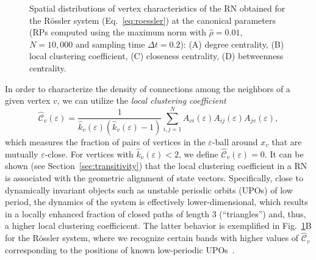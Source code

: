 \documentclass[graybox]{svmult}
\begin{document}
\begin{figure}
\centering
{}
\caption{Spatial distributions of vertex characteristics of the RN obtained for the R\"ossler system (Eq.~\ref{eq:roessler}) at the canonical parameters (RPs computed using the maximum norm with $\hat{\rho}=0.01$, $N=10,000$ and sampling time $\Delta t=0.2$): (A) degree centrality, (B) local clustering coefficient, (C) closeness centrality, (D) betweenness centrality.}
\label{fig:local}
\end{figure}

In order to characterize the density of connections among the neighbors of a given vertex $v$, we can utilize the \textit{local clustering coefficient}
\begin{equation}
\hat{\mathcal{C}}_v(\varepsilon)=\frac{1}{\hat{k}_v(\varepsilon)(\hat{k}_v(\varepsilon)-1)} \sum_{i,j=1}^N A_{vi}(\varepsilon) A_{ij}(\varepsilon) A_{jv}(\varepsilon),
\label{eq:locclustering}
\end{equation}
\noindent
which measures the fraction of pairs of vertices in the $\varepsilon$-ball around $x_v$ that are
mutually $\varepsilon$-close. For vertices with $\hat{k}_v(\varepsilon)<2$, we define $\hat{\mathcal{C}}_v(\varepsilon)=0$. It can be shown (see Section~\ref{sec:transitivity}) that the local clustering coefficient in a RN is associated with the geometric alignment of state vectors. Specifically, close to dynamically invariant objects such as unstable periodic orbits (UPOs) of low period, the dynamics of the system is effectively lower-dimensional, which results in a locally enhanced fraction of closed paths of length 3 (``triangles'') and, thus, a higher local clustering coefficicent. The latter behavior is exemplified in Fig.~\ref{fig:local}B for the R\"ossler system, where we recognize certain bands with higher values of $\hat{\mathcal{C}}_v$ corresponding to the positions of known low-periodic UPOs~\cite{Donner2010NJP}.
\end{document}
